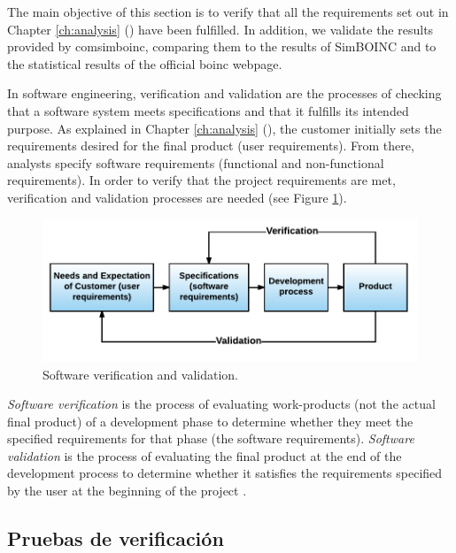 The main objective of this section is to verify that all the requirements set out in Chapter \ref{ch:analysis} (\textit{}) have been fulfilled. In addition, we validate the results provided by \gls{comsimboinc}, comparing them to the results of SimBOINC and to the statistical results of the official \gls{boinc} webpage.

In software engineering, verification and validation are the processes of checking that a software system meets specifications and that it fulfills its intended purpose. As explained in Chapter \ref{ch:analysis} (\textit{}), the customer initially sets the requirements desired for the final product (user requirements). From there, analysts specify software requirements (functional and non-functional requirements). In order to verify that the project requirements are met, verification and validation processes are needed (see Figure \ref{fig:verification_validation}).

\vspace{1cm}

\begin{figure}[htb]
 	\centering
 	\includegraphics[width=12cm]{figures/verification_validation}
 	\caption{Software verification and validation.}
	\label{fig:verification_validation}
\end{figure}

\vspace{1cm}

\textit{Software verification} is the process of evaluating work-products (not the actual final product) of a development phase to determine whether they meet the specified requirements for that phase (the software requirements). \textit{Software validation} is the process of evaluating the final product at the end of the development process to determine whether it satisfies the requirements specified by the user at the beginning of the project \cite{verification}.


\subsection{Pruebas de verificación}

